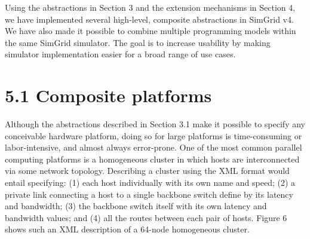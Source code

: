 \documentclass[
]{article}
\begin{document}
Using the abstractions in Section 3 and the extension mechanisms in
Section 4, we have implemented several high-level, composite
abstractions in SimGrid v4. We have also made it possible to combine
multiple programming models within the same SimGrid simulator. The goal
is to increase usability by making simulator implementation easier for a
broad range of use cases.

\section{5.1 Composite platforms}\label{composite-platforms}

Although the abstractions described in Section 3.1 make it possible to
specify any conceivable hardware platform, doing so for large platforms
is time-consuming or labor-intensive, and almost always error-prone. One
of the most common parallel computing platforms is a homogeneous cluster
in which hosts are interconnected via some network topology. Describing
a cluster using the XML format would entail specifying: (1) each host
individually with its own name and speed; (2) a private link connecting
a host to a single backbone switch define by its latency and bandwidth;
(3) the backbone switch itself with its own latency and bandwidth
values; and (4) all the routes between each pair of hosts. Figure 6
shows such an XML description of a 64-node homogeneous cluster.
\end{document}
